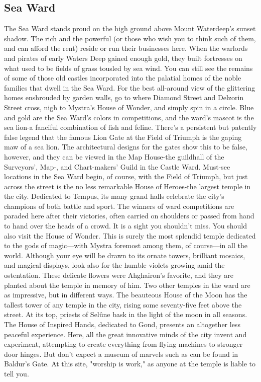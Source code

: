 \documentclass[10pt,a4paper,twoside,twocolumn,openany,nodeprecatedcode]{dndbook}
\begin{document}
\subsection{Sea Ward}
The Sea Ward stands proud on the high ground above Mount Waterdeep's sunset shadow. The rich and the powerful (or those who wish you to think such of them, and can afford the rent) reside or run their businesses here. When the warlords and pirates of early Waters Deep gained enough gold, they built fortresses on what used to be fields of grass tousled by sea wind. You can still see the remains of some of those old castles incorporated into the palatial homes of the noble families that dwell in the Sea Ward. For the best all-around view of the glittering homes enshrouded by garden walls, go to where Diamond Street and Delzorin Street cross, nigh to Mystra's House of Wonder, and simply spin in a circle.
Blue and gold are the Sea Ward's colors in competitions, and the ward's mascot is the sea lion-a fanciful combination of fish and feline. There's a persistent but patently false legend that the famous Lion Gate at the Field of Triumph is the gaping maw of a sea lion. The architectural designs for the gates show this to be false, however, and they can be viewed in the Map House-the guildhall of the Surveyors', Map-, and Chart-makers' Guild in the Castle Ward.
Must-see locations in the Sea Ward begin, of course, with the Field of Triumph, but just across the street is the no less remarkable House of Heroes-the largest temple in the city. Dedicated to Tempus, its many grand halls celebrate the city's champions of both battle and sport. The winners of ward competitions are paraded here after their victories, often carried on shoulders or passed from hand to hand over the heads of a crowd. It is a sight you shouldn't miss.
You should also visit the House of Wonder. This is surely the most splendid temple dedicated to the gods of magic—with Mystra foremost among them, of course—in all the world. Although your eye will be drawn to its ornate towers, brilliant mosaics, and magical displays, look also for the humble violets growing amid the ostentation. These delicate flowers were Ahghairon's favorite, and they are planted about the temple in memory of him.
Two other temples in the ward are as impressive, but in different ways. The beauteous House of the Moon has the tallest tower of any temple in the city, rising some seventy-five feet above the street. At its top, priests of Selûne bask in the light of the moon in all seasons. The House of Inspired Hands, dedicated to Gond, presents an altogether less peaceful experience. Here, all the great innovative minds of the city invent and experiment, attempting to create everything from flying machines to stronger door hinges. But don't expect a museum of marvels such as can be found in Baldur's Gate. At this site, "worship is work," as anyone at the temple is liable to tell you.
\end{document}
